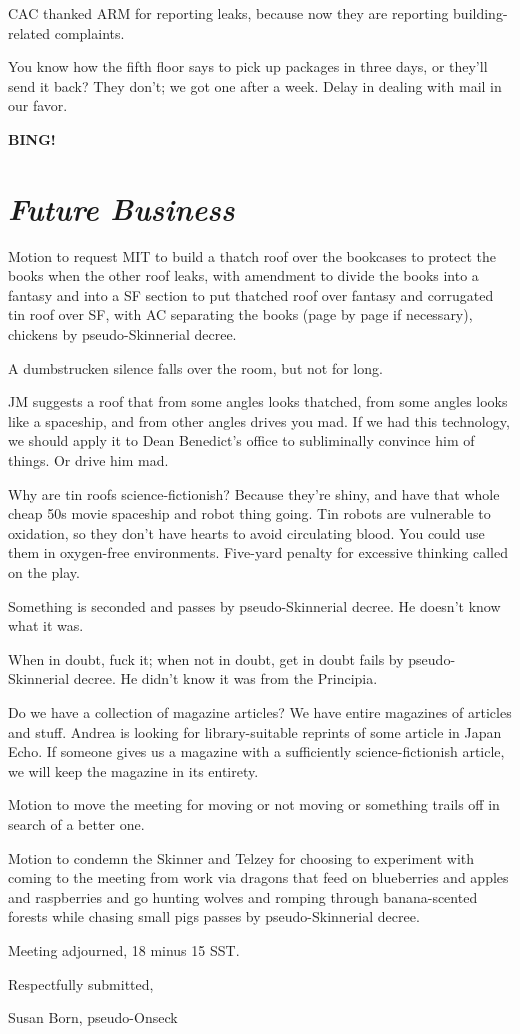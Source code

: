 \documentclass[10pt]{article}
\newcommand{\bing}{{\bf BING!} }
\newcommand{\goto}[1]{\bing \vskip 12pt \section*{{\em{#1}}}}
\begin{document}
CAC thanked ARM for reporting leaks, because now they are reporting
building-related complaints.

You know how the fifth floor says to pick up packages in three days,
or they'll send it back?  They don't; we got one after a week.  Delay
in dealing with mail in our favor.


\goto{Future Business}

Motion to request MIT to build a thatch roof over the bookcases to
protect the books when the other roof leaks, with amendment to divide
the books into a fantasy and into a SF section to put thatched roof
over fantasy and corrugated tin roof over SF, with AC separating the
books (page by page if necessary), chickens by pseudo-Skinnerial
decree.

A dumbstrucken silence falls over the room, but not for long.

JM suggests a roof that from some angles looks thatched, from some
angles looks like a spaceship, and from other angles drives you mad.
If we had this technology, we should apply it to Dean Benedict's
office to subliminally convince him of things.  Or drive him mad.

Why are tin roofs science-fictionish?  Because they're shiny, and have
that whole cheap 50s movie spaceship and robot thing going.  Tin
robots are vulnerable to oxidation, so they don't have hearts to avoid
circulating blood.  You could use them in oxygen-free environments.
Five-yard penalty for excessive thinking called on the play.

Something is seconded and passes by pseudo-Skinnerial decree.  He
doesn't know what it was.  

When in doubt, fuck it; when not in doubt, get in doubt fails by
pseudo-Skinnerial decree.  He didn't know it was from the Principia.

Do we have a collection of magazine articles?  We have entire
magazines of articles and stuff.  Andrea is looking for
library-suitable reprints of some article in Japan Echo.  If someone
gives us a magazine with a sufficiently science-fictionish article, we
will keep the magazine in its entirety.

Motion to move the meeting for moving or not moving or something
trails off in search of a better one.

Motion to condemn the Skinner and Telzey for choosing to experiment
with coming to the meeting from work via dragons that feed on
blueberries and apples and raspberries and go hunting wolves and
romping through banana-scented forests while chasing small pigs passes
by pseudo-Skinnerial decree. 

\vspace{12pt}

\noindent
Meeting adjourned, 18 minus 15 SST.

\vspace{18pt}

\centerline{Respectfully submitted,}
\centerline{Susan Born, pseudo-Onseck}
\end{document}
